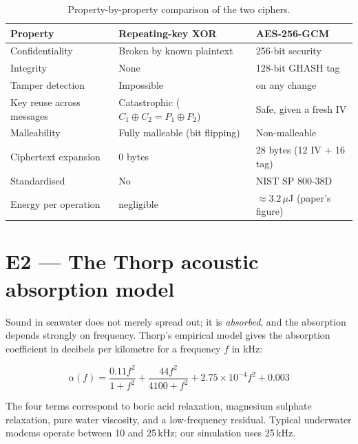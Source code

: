 \begin{table}[H]
\centering
\caption{Property-by-property comparison of the two ciphers.}
\label{tab:cipher-cmp}
\small
\begin{tabularx}{\textwidth}{@{}L{44mm} L{40mm} X@{}}
\toprule
\textbf{Property} & \textbf{Repeating-key XOR} & \textbf{AES-256-GCM}\\
\midrule
Confidentiality      & Broken by known plaintext & 256-bit security\\
Integrity            & None                      & 128-bit GHASH tag\\
Tamper detection     & Impossible                &  on any change\\
Key reuse across messages & Catastrophic ($C_1\oplus C_2 = P_1\oplus P_2$) & Safe, given a fresh IV\\
Malleability         & Fully malleable (bit flipping) & Non-malleable\\
Ciphertext expansion & 0 bytes                   & 28 bytes (12 IV $+$ 16 tag)\\
Standardised         & No                        & NIST SP 800-38D\\
Energy per operation & negligible                & $\approx 3.2\,\mu$J (paper's figure)\\
\bottomrule
\end{tabularx}
\end{table}

\section{E2 --- The Thorp acoustic absorption model}
\label{sec:thorp}

Sound in seawater does not merely spread out; it is \emph{absorbed}, and the absorption
depends strongly on frequency. Thorp's empirical model \cite{thorp} gives the absorption
coefficient in decibels per kilometre for a frequency $f$ in kHz:

\begin{equation}
\alpha(f) = \frac{0.11 f^{2}}{1+f^{2}} + \frac{44 f^{2}}{4100+f^{2}}
          + 2.75\times10^{-4} f^{2} + 0.003
\label{eq:thorp}
\end{equation}

The four terms correspond to boric acid relaxation, magnesium sulphate relaxation, pure
water viscosity, and a low-frequency residual. Typical underwater modems operate between
10 and 25\,kHz; our simulation uses 25\,kHz.

